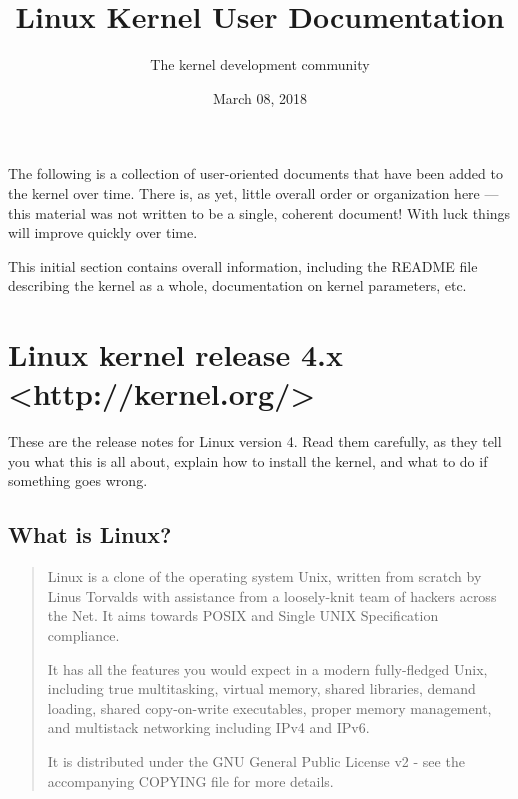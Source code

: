 \documentclass[a4paper,8pt,english]{sphinxmanual}
\title{Linux Kernel User Documentation}
\date{March 08, 2018}
\author{The kernel development community}
\begin{document}
\maketitle
\tableofcontents
{}\label{admin-guide/index::doc}


The following is a collection of user-oriented documents that have been
added to the kernel over time.  There is, as yet, little overall order or
organization here — this material was not written to be a single, coherent
document!  With luck things will improve quickly over time.

This initial section contains overall information, including the README
file describing the kernel as a whole, documentation on kernel parameters,
etc.


\chapter{Linux kernel release 4.x \textless{}http://kernel.org/\textgreater{}}
\label{admin-guide/README:the-linux-kernel-user-s-and-administrator-s-guide}\label{admin-guide/README:linux-kernel-release-4-x-http-kernel-org}\label{admin-guide/README::doc}
These are the release notes for Linux version 4.  Read them carefully,
as they tell you what this is all about, explain how to install the
kernel, and what to do if something goes wrong.


\section{What is Linux?}
\label{admin-guide/README:what-is-linux}\begin{quote}

Linux is a clone of the operating system Unix, written from scratch by
Linus Torvalds with assistance from a loosely-knit team of hackers across
the Net. It aims towards POSIX and Single UNIX Specification compliance.

It has all the features you would expect in a modern fully-fledged Unix,
including true multitasking, virtual memory, shared libraries, demand
loading, shared copy-on-write executables, proper memory management,
and multistack networking including IPv4 and IPv6.

It is distributed under the GNU General Public License v2 - see the
accompanying COPYING file for more details.
\end{quote}
\end{document}
